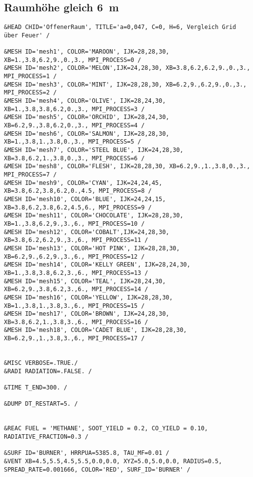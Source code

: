 \subsection*{Raumhöhe gleich 6~m}
\begin{lstlisting}[emptylines=0, basicstyle=\tiny]
&HEAD CHID='OffenerRaum', TITLE='a=0,047, C=0, H=6, Vergleich Grid über Feuer' /

&MESH ID='mesh1', COLOR='MAROON', IJK=28,28,30, XB=1.,3.8,6.2,9.,0.,3., MPI_PROCESS=0 /
&MESH ID='mesh2', COLOR='MELON',IJK=24,28,30, XB=3.8,6.2,6.2,9.,0.,3., MPI_PROCESS=1 /
&MESH ID='mesh3', COLOR='MINT', IJK=28,28,30, XB=6.2,9.,6.2,9.,0.,3., MPI_PROCESS=2 /
&MESH ID='mesh4', COLOR='OLIVE', IJK=28,24,30, XB=1.,3.8,3.8,6.2,0.,3., MPI_PROCESS=3 /
&MESH ID='mesh5', COLOR='ORCHID', IJK=28,24,30, XB=6.2,9.,3.8,6.2,0.,3., MPI_PROCESS=4 /
&MESH ID='mesh6', COLOR='SALMON', IJK=28,28,30, XB=1.,3.8,1.,3.8,0.,3., MPI_PROCESS=5 /
&MESH ID='mesh7', COLOR='STEEL BLUE', IJK=24,28,30, XB=3.8,6.2,1.,3.8,0.,3., MPI_PROCESS=6 /
&MESH ID='mesh8', COLOR='FLESH', IJK=28,28,30, XB=6.2,9.,1.,3.8,0.,3., MPI_PROCESS=7 /
&MESH ID='mesh9', COLOR='CYAN', IJK=24,24,45, XB=3.8,6.2,3.8,6.2,0.,4.5, MPI_PROCESS=8 /
&MESH ID='mesh10', COLOR='BLUE', IJK=24,24,15, XB=3.8,6.2,3.8,6.2,4.5,6., MPI_PROCESS=9 /
&MESH ID='mesh11', COLOR='CHOCOLATE', IJK=28,28,30, XB=1.,3.8,6.2,9.,3.,6., MPI_PROCESS=10 /
&MESH ID='mesh12', COLOR='COBALT',IJK=24,28,30, XB=3.8,6.2,6.2,9.,3.,6., MPI_PROCESS=11 /
&MESH ID='mesh13', COLOR='HOT PINK', IJK=28,28,30, XB=6.2,9.,6.2,9.,3.,6., MPI_PROCESS=12 /
&MESH ID='mesh14', COLOR='KELLY GREEN', IJK=28,24,30, XB=1.,3.8,3.8,6.2,3.,6., MPI_PROCESS=13 /
&MESH ID='mesh15', COLOR='TEAL', IJK=28,24,30, XB=6.2,9.,3.8,6.2,3.,6., MPI_PROCESS=14 /
&MESH ID='mesh16', COLOR='YELLOW', IJK=28,28,30, XB=1.,3.8,1.,3.8,3.,6., MPI_PROCESS=15 /
&MESH ID='mesh17', COLOR='BROWN', IJK=24,28,30, XB=3.8,6.2,1.,3.8,3.,6., MPI_PROCESS=16 /
&MESH ID='mesh18', COLOR='CADET BLUE', IJK=28,28,30, XB=6.2,9.,1.,3.8,3.,6., MPI_PROCESS=17 /


&MISC VERBOSE=.TRUE./
&RADI RADIATION=.FALSE. /

&TIME T_END=300. /

&DUMP DT_RESTART=5. /


&REAC FUEL = 'METHANE', SOOT_YIELD = 0.2, CO_YIELD = 0.10, RADIATIVE_FRACTION=0.3 /

&SURF ID='BURNER', HRRPUA=5385.8, TAU_MF=0.01 /
&VENT XB=4.5,5.5,4.5,5.5,0.0,0.0, XYZ=5.0,5.0,0.0, RADIUS=0.5, SPREAD_RATE=0.001666, COLOR='RED', SURF_ID='BURNER' /



\end{lstlisting}
